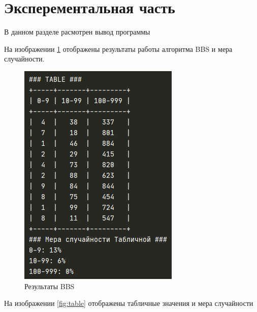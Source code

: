 \section{Эксперементальная часть}
В данном разделе расмотрен вывод программы

На изображении \ref{fig:bbs} отображены результаты работы алгоритма BBS и мера случайности.

\begin{figure}[!h]
	\centering
	\includegraphics[width=0.7\linewidth]{src/BBS}
	\caption{Результаты BBS}
	\label{fig:bbs}
\end{figure}

На изображении \ref{fig:table} отображены табличные значения и мера случайности

